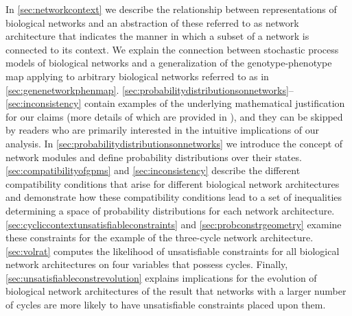 In \ref{sec:networkcontext} we describe the relationship between representations of biological networks and an abstraction of these referred to as network architecture that indicates the manner in which a subset of a network is connected to its context. We explain the connection between stochastic process models of biological networks and a generalization of the genotype-phenotype map applying to arbitrary biological networks referred to as \gnpm{} in \ref{sec:genenetworkphenmap}. \ref{sec:probabilitydistributionsonnetworks}--\ref{sec:inconsistency} contain examples of the underlying mathematical justification for our claims (more details of which are provided in ), and they can be skipped by readers who are primarily interested in the intuitive implications of our analysis. In \ref{sec:probabilitydistributionsonnetworks} we introduce the concept of network modules and define probability distributions over their states. \ref{sec:compatibilityofgpms} and \ref{sec:inconsistency} describe the different compatibility conditions that arise for different biological network architectures and demonstrate how these compatibility conditions lead to a set of inequalities determining a space of probability distributions for each network architecture. \ref{sec:cycliccontextunsatisfiableconstraints} and \ref{sec:probconstrgeometry} examine these constraints for the example of the three-cycle network architecture. \ref{sec:volrat} computes the likelihood of unsatisfiable constraints for all biological network architectures on four variables that possess cycles. Finally, \ref{sec:unsatisfiableconstrevolution} explains implications for the evolution of biological network architectures of the result that networks with a larger number of cycles are more likely to have unsatisfiable constraints placed upon them.


